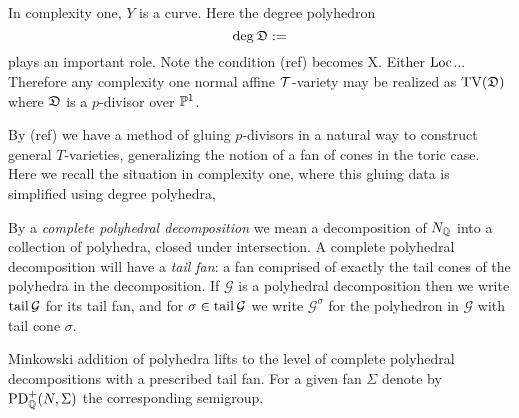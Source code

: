 In complexity one, \(Y\) is a curve. Here the degree polyhedron
\[
\deg {\mathfrak{D}} :=
\]
plays an important role. Note the condition (ref) becomes X. Either \(\operatorname{Loc} \)... Therefore any complexity one normal affine \({\mathcal{T}}\)-variety may be realized as \(\operatorname{TV}({\mathfrak{D}})\) where \({\mathfrak{D}}\) is a \(p\)-divisor over \(\mathbb{P}^1\).

By (ref) we have a method of gluing \(p\)-divisors in a natural way to construct general \(T\)-varieties, generalizing the notion of a fan of cones in the toric case. Here we recall the situation in complexity one, where this gluing data is simplified using degree polyhedra, 

By a \textit{complete polyhedral decomposition} we mean a decomposition of \(N_{\mathbb{Q}}\) into a collection of polyhedra, closed under intersection. A complete polyhedral decomposition will have a \textit{tail fan}: a fan comprised of exactly the tail cones of the polyhedra in the decomposition. If \(\mathcal{G}\) is a polyhedral decomposition then we write \(\operatorname{tail} \mathcal{G}\) for its tail fan, and for \(\sigma \in \operatorname{tail} \mathcal{G}\) we write  \(\mathcal{G}^\sigma\) for the polyhedron in \(\mathcal{G}\) with tail cone \(\sigma\).

Minkowski addition of polyhedra lifts to the level of complete polyhedral decompositions with a prescribed tail fan. For a given fan \(\Sigma\) denote by \(\operatorname{PD}^+_{\mathbb{Q}}(N,\Sigma)\) the corresponding semigroup.

